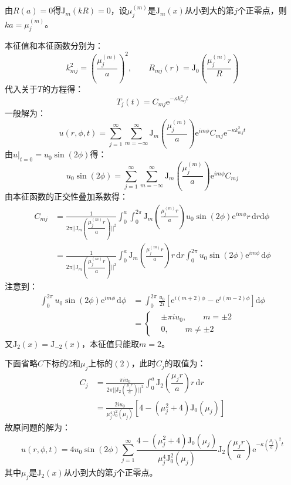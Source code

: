 \documentclass[fontset=windows]{ctexart}
\begin{document}
\begin{itemize}
    由$R(a) = 0$得$\mathrm{J}_m(kR) = 0$，设$\mu_j^{(m)}$是$\mathrm{J}_m(x)$从小到大的第$j$个正零点，则$ka = \mu_j^{(m)}$。

    本征值和本征函数分别为：
    \[
    k_{mj}^2 = \left(\frac{\mu_j^{(m)}}{a}\right)^2,\qquad R_{mj}(r) = \mathrm{J}_0\left(\frac{\mu_j^{(m)} r}{R}\right)
    \]
    代入关于$T$的方程得：
    \[
    T_j(t) = C_{mj}\mathrm{e}^{-\kappa k_{mj}^2 t}
    \]
    一般解为：
    \[
    u(r,\phi,t) = \sum_{j=1}^{\infty}\sum_{m=-\infty}^{\infty} \mathrm{J}_m\left(\frac{\mu_j^{(m)}}{a}\right) \mathrm{e}^{im\phi}C_{mj}\mathrm{e}^{-\kappa k_{mj}^2 t}
    \]
    由$\left.u\right|_{t=0} = u_0\sin(2\phi)$得：
    \[
    u_0\sin(2\phi) = \sum_{j=1}^{\infty}\sum_{m=-\infty}^{\infty} \mathrm{J}_m\left(\frac{\mu_j^{(m)}}{a}\right) \mathrm{e}^{im\phi}C_{mj}
    \]
    由本征函数的正交性叠加系数得：
    \begin{align*}
        C_{mj}
        &= \frac{1}{2\pi\Bigg|\Bigg|\mathrm{J}_m\left(\dfrac{\mu_j^{(m)}r}{a}\right)\Bigg|\Bigg|^2} \int_0^a\int_0^{2\pi} \mathrm{J}_m\left(\frac{\mu_j^{(m)}r}{a}\right)u_0\sin(2\phi)\mathrm{e}^{im\phi}r \,\mathrm{d}r\mathrm{d}\phi \\
        &= \frac{1}{2\pi\Bigg|\Bigg|\mathrm{J}_m\left(\dfrac{\mu_j^{(m)}r}{a}\right)\Bigg|\Bigg|^2} \int_0^a \mathrm{J}_m\left(\frac{\mu_j^{(m)}r}{a}\right)r \,\mathrm{d}r \int_0^{2\pi} u_0\sin(2\phi)\mathrm{e}^{im\phi}\,\mathrm{d}\phi
    \end{align*}
    注意到：
    \begin{align*}
    \int_0^{2\pi} u_0\sin(2\phi)\mathrm{e}^{im\phi}\,\mathrm{d}\phi
    &= \int_0^{2\pi}\frac{u_0}{2i}\left[\mathrm{e}^{i(m+2)\phi} - \mathrm{e}^{i(m-2)\phi}\right]\mathrm{d}\phi \\
    &= \left\{
    \begin{aligned}
        & \pm\pi i u_0,\qquad m = \pm2 \\
        & 0,\qquad m \neq \pm2
    \end{aligned}
    \right.
    \end{align*}
    又$\mathrm{J}_2(x) = \mathrm{J}_{-2}(x)$，本征值只能取$m = 2$。

    下面省略$C$下标的2和$\mu_j$上标的$(2)$，此时$C_{j}$的取值为：
    \begin{align*}
    C_{j}
    &= \frac{\pi i u_0}{2\pi\Bigg|\Bigg|\mathrm{J}_2\left(\frac{\mu_jr}{a}\right)\Bigg|\Bigg|^2} \int_0^a \mathrm{J}_2\left(\dfrac{\mu_j r}{a}\right)r \,\mathrm{d}r \\
    &= \frac{2i u_0}{\mu_j^4 \mathrm{J}_0^2(\mu_j)}\left[4 - (\mu_j^2 + 4)\mathrm{J}_0(\mu_j)\right]
    \end{align*}
    故原问题的解为：
    \[
    u(r,\phi,t) = 4u_0\sin(2\phi)\sum_{j=1}^{\infty} \frac{4 - (\mu_j^2 + 4)\mathrm{J}_0(\mu_j)}{\mu_j^4 \mathrm{J}_0^2(\mu_j)}\mathrm{J}_2\left(\frac{\mu_j r}{a}\right)\mathrm{e}^{-\kappa\left(\tfrac{\mu_j}{a}\right)^2 t}
    \]
    其中$\mu_j$是$\mathrm{J}_2(x)$从小到大的第$j$个正零点。
    \bigskip


\end{itemize}
\end{document}
